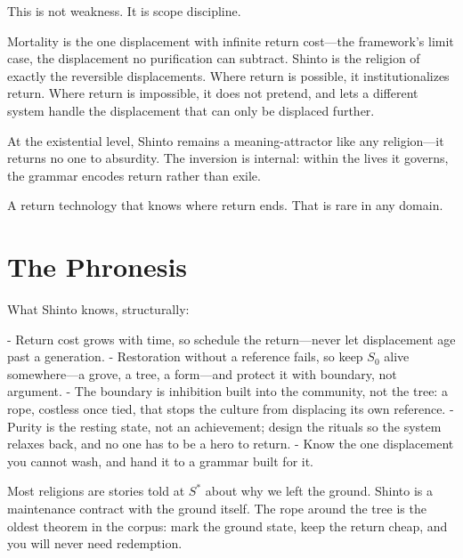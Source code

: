 \documentclass[12pt]{article}
\begin{document}
This is not weakness. It is scope discipline.

Mortality is the one displacement with infinite return cost---the framework's limit case, the displacement no purification can subtract. Shinto is the religion of exactly the reversible displacements. Where return is possible, it institutionalizes return. Where return is impossible, it does not pretend, and lets a different system handle the displacement that can only be displaced further.

At the existential level, Shinto remains a meaning-attractor like any religion---it returns no one to absurdity. The inversion is internal: within the lives it governs, the grammar encodes return rather than exile.

A return technology that knows where return ends. That is rare in any domain.

\section{The Phronesis}

What Shinto knows, structurally:

- Return cost grows with time, so schedule the return---never let displacement age past a generation.
- Restoration without a reference fails, so keep $S_0$ alive somewhere---a grove, a tree, a form---and protect it with boundary, not argument.
- The boundary is inhibition built into the community, not the tree: a rope, costless once tied, that stops the culture from displacing its own reference.
- Purity is the resting state, not an achievement; design the rituals so the system relaxes back, and no one has to be a hero to return.
- Know the one displacement you cannot wash, and hand it to a grammar built for it.

Most religions are stories told at $S^*$ about why we left the ground. Shinto is a maintenance contract with the ground itself. The rope around the tree is the oldest theorem in the corpus: mark the ground state, keep the return cheap, and you will never need redemption.
\end{document}
